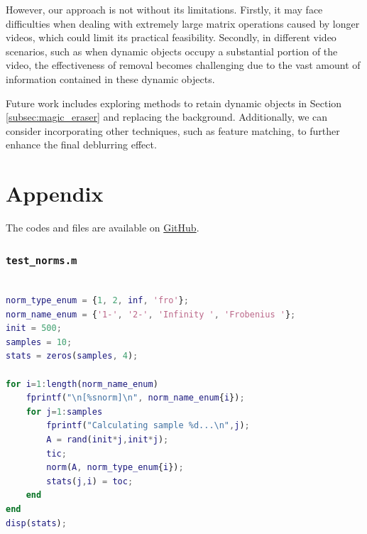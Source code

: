 \documentclass[12pt]{article}
\theoremstyle{definition}
\begin{document}
However, our approach is not without its limitations. Firstly, it may face difficulties when dealing with extremely large matrix operations caused by longer videos, which could limit its practical feasibility. Secondly, in different video scenarios, such as when dynamic objects occupy a substantial portion of the video, the effectiveness of removal becomes challenging due to the vast amount of information contained in these dynamic objects.

Future work includes exploring methods to retain dynamic objects in Section \ref{subsec:magic_eraser} and replacing the background. Additionally, we can consider incorporating other techniques, such as feature matching, to further enhance the final deblurring effect.

\section*{Appendix}
The codes and files are available on \href{https://github.com/lemonade0715/1121_scientific_computation}{GitHub}.

\subsubsection*{\texttt{test\_norms.m}}
\begin{lstlisting}[language=Matlab, style=mystyle]
% test_norms.m

norm_type_enum = {1, 2, inf, 'fro'};
norm_name_enum = {'1-', '2-', 'Infinity ', 'Frobenius '};
init = 500;
samples = 10;
stats = zeros(samples, 4);

for i=1:length(norm_name_enum)
    fprintf("\n[%snorm]\n", norm_name_enum{i});
    for j=1:samples
        fprintf("Calculating sample %d...\n",j);
        A = rand(init*j,init*j);
        tic;
        norm(A, norm_type_enum{i});
        stats(j,i) = toc;
    end
end
disp(stats);
\end{lstlisting}
\end{document}
